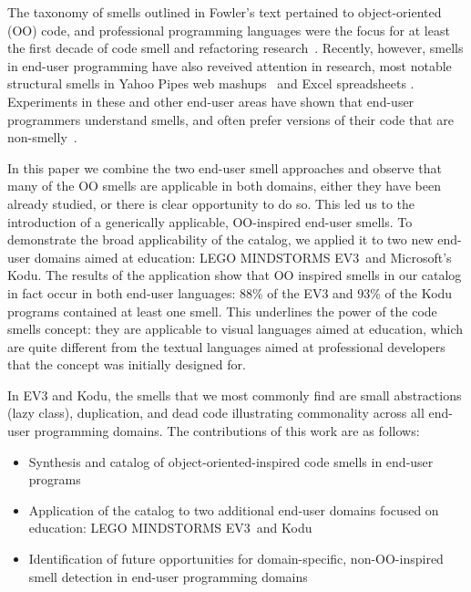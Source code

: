 \documentclass{sig-alternate}
\newcommand{\ms}{LEGO MINDSTORMS EV3}
\begin{document}
The taxonomy of smells outlined in Fowler's text pertained to object-oriented (OO) code, and professional programming languages were the focus for at least the first decade of code smell  and refactoring research~\cite{Mens:2004:SSR:972215.972286}. Recently, however, smells in end-user programming have also reveived attention in research, most notable structural smells in Yahoo Pipes web mashups~\cite{Stolee2011} and Excel spreadsheets \cite{Hermans2012inter}. Experiments in these and other end-user areas have shown that end-user programmers understand smells, and often prefer versions of their code that are non-smelly~\cite{Hermans2012intra, StoleeTSE2013, chambers2013smell}.


In this paper we combine the two end-user smell approaches and observe that many of the OO smells are applicable in both domains, either they have been already studied, or there is clear opportunity to do so. This led us to the introduction of a generically applicable, OO-inspired end-user smells. To demonstrate the broad applicability of the catalog, we applied it to two new end-user domains aimed at education: \ms~and Microsoft's Kodu. The results of the application show that OO inspired smells in our catalog in fact occur in both end-user languages: 88\% of the EV3 and 93\% of the Kodu programs contained at least one smell. This underlines the power of the code smells concept: they are applicable to visual languages aimed at education, which are quite different from the textual languages aimed at professional developers that the concept was initially designed for. 

In EV3 and Kodu, the smells that we most commonly find are small abstractions (lazy class), duplication, and dead code illustrating commonality across all end-user programming domains. The contributions of this work are as follows:

\begin{itemize}
	\item Synthesis and catalog of object-oriented-inspired code smells in end-user programs
	\item Application of the catalog to two additional end-user domains focused on education: \ms~and Kodu
	\item Identification of future opportunities for domain-specific, non-OO-inspired smell detection in end-user programming domains
\end{itemize}
\end{document}

